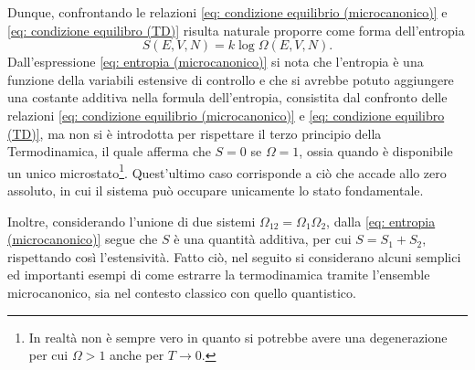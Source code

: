 Dunque, confrontando le relazioni \eqref{eq: condizione equilibrio (microcanonico)} e \eqref{eq: condizione equilibro (TD)} risulta naturale proporre come forma dell'entropia 
\begin{equation}
\label{eq: entropia (microcanonico)}
    S(E,V,N) = k\log{\Omega(E,V,N)}.
\end{equation}
Dall'espressione \eqref{eq: entropia (microcanonico)} si nota che l'entropia è una funzione della variabili estensive di controllo e che si avrebbe potuto aggiungere una costante additiva nella formula dell'entropia, consistita dal confronto delle relazioni \eqref{eq: condizione equilibrio (microcanonico)} e \eqref{eq: condizione equilibro (TD)}, ma non si è introdotta per rispettare il terzo principio della Termodinamica, il quale afferma che $S = 0$ se $\Omega = 1$, ossia quando è disponibile un unico microstato\footnote{In realtà non è sempre vero in quanto si potrebbe avere una degenerazione per cui $\Omega > 1$ anche per $T\to0$.}. Quest'ultimo caso corrisponde a ciò che accade allo zero assoluto, in cui il sistema può occupare unicamente lo stato fondamentale. 

Inoltre, considerando l'unione di due sistemi $\Omega_{12} = \Omega_1\Omega_2$, dalla \eqref{eq: entropia (microcanonico)} segue che $S$ è una quantità additiva, per cui $S = S_1 + S_2$, rispettando così l'estensività. Fatto ciò, nel seguito si considerano alcuni semplici ed importanti esempi di come estrarre la termodinamica tramite l'ensemble microcanonico, sia nel contesto classico con quello quantistico. 

